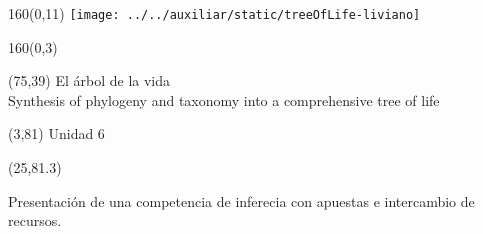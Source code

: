 \documentclass[shownotes,aspectratio=169]{beamer}
\begin{document}
\begin{frame}

\begin{textblock}{160}(0,11)  \centering
\texttt{[image: ../../auxiliar/static/treeOfLife-liviano]}
\end{textblock}

\begin{textblock}{160}(0,3) \centering
\LARGE \textcolor{black!85}{}
\end{textblock}


\begin{textblock}{55}(75,39)
\textcolor{black!85}{\normalsize El árbol de la vida \\
\fontsize{2}{0}\selectfont Synthesis of phylogeny and taxonomy into a comprehensive tree of life \\}
\end{textblock}


\begin{textblock}{55}(3,81)
\textcolor{black!85}{Unidad 6}
\end{textblock}

\begin{textblock}{55}(25,81.3)
\begin{turn}{0}
\parbox{15cm}{\small \textcolor{black!85}{Presentación de una competencia de inferecia con apuestas e intercambio de recursos.}
}
\end{turn}
\end{textblock}

\end{frame}
\end{document}
